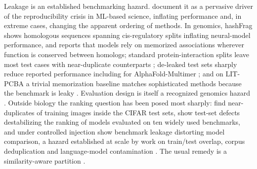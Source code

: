 \documentclass[webpdf,modern,large,namedate]{oup-authoring-template}%
\begin{document}
Leakage is an established benchmarking hazard. \citet{kapoor2023leakage} document it as a pervasive driver of the reproducibility crisis in ML-based science, inflating performance and, in extreme cases, changing the apparent ordering of methods. In genomics, hashFrag \citep{rafi2026} shows homologous sequences spanning cis-regulatory splits inflating neural-model performance, and reports that models rely on memorized associations wherever function is conserved between homologs; standard protein-interaction splits leave most test cases with near-duplicate counterparts \citep{bushuiev2024}; de-leaked test sets sharply reduce reported performance including for AlphaFold-Multimer \citep{kovtun2024}; and on LIT-PCBA a trivial memorization baseline matches sophisticated methods because the benchmark is leaky \citep{huang2025}. Evaluation design is itself a recognized genomics hazard \citep{whalen2022pitfalls,schreiber2020pitfall,toneyan2022evaluating}. Outside biology the ranking question has been posed most sharply: \citet{barz2020cifar} find near-duplicates of training images inside the CIFAR test sets, \citet{northcutt2021labelerrors} show test-set defects destabilizing the ranking of models evaluated on ten widely used benchmarks, and under controlled injection \citet{zhou2023cheater} show benchmark leakage distorting model comparison, a hazard established at scale by work on train/test overlap, corpus deduplication and language-model contamination \citep{elangovan2021leakage,lee2022dedup,sainz2023contamination,magar2022contamination,deng2024contamination}. The usual remedy is a similarity-aware partition \citep{hobohm1992,walsh2016correct,teufel2023graphpart,petti2022benchmark,li2006cdhit,steinegger2017mmseqs2}.
\end{document}

